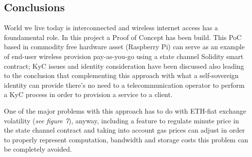 \documentclass[12pt]{amsart}
\begin{document}
\begin{multicols}{2}






\section{Conclusions}\label{sec:conclusions}

\vspace{0.35cm}

World we live today is interconnected and wireless
internet access has a foundamental role. In this project
a Proof of Concept has been build. This PoC based in
commodity free hardware asset (Raspberry Pi) can serve
as an example of end-user wireless provision pay-as-you-go
using a state channel Solidity smart contract; KyC issues
and identity consideration have been discussed also leading
to the conclusion that complementing this approach with
what a self-sovereign identity can provide there's no need
to a telecommunication operator to perform a KyC process
in order to provision a service to a client.

\vspace{0.35cm}

One of the major problems with this approach has to do
with ETH-fiat exchange volatility
(\textit{see figure 7}), anyway, including
a feature to regulate minute price in the state channel
contract and taking into account gas prices can adjust
in order to properly
represent computation, bandwidth and storage costs this
problem can be completely avoided.


\end{multicols}
\end{document}
